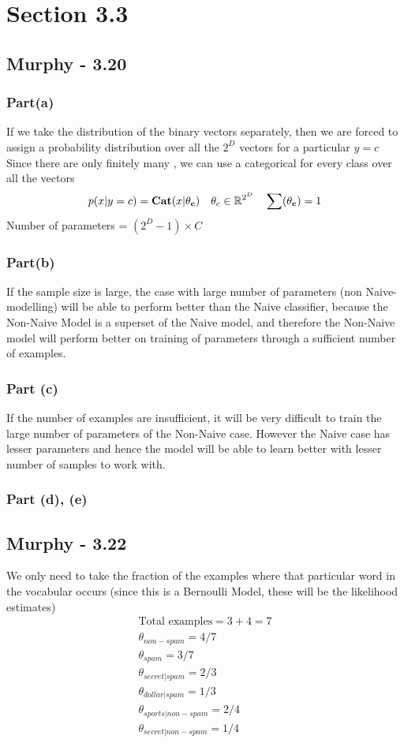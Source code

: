 \section{Section 3.3}

\subsection{Murphy - 3.20}
\subsubsection{Part(a)}
If we take the distribution of the binary vectors separately, then we are forced to assign a probability distribution over all the $2^D$ vectors for a particular $y = c$
Since there are only finitely many , we can use a categorical for every class over all the vectors
\begin{equation}
    p(x|y = c) =  \textbf{Cat}(x | \vb{\theta_c}) \ \ \ \theta_c \in \mathbb{R}^{2^D}  \ \ \ \sum(\vb{\theta_c}) = 1
\end{equation}
Number of parameters = $(2^D - 1) \times C$
\subsubsection{Part(b)}
If the sample size is large, the case with large number of parameters (non Naive- modelling) will be able to perform better than the Naive classifier, because the Non-Naive Model is a superset of the Naive model, and therefore the Non-Naive model will perform better on training of parameters through a sufficient number of examples.

\subsubsection{Part (c)}
If the number of examples are insufficient, it will be very difficult to train the large number of parameters of the Non-Naive case. However the Naive case has lesser parameters and hence the model will be able to learn better with lesser number of samples to work with.

\subsubsection{Part (d), (e)}


\subsection{Murphy - 3.22}
We only need to take the fraction of the examples where that particular word in the vocabular occurs  (since this is a Bernoulli Model, these will be the likelihood estimates)
\begin{gather}
    \text{Total examples} = 3 + 4 = 7\\
    \theta_{non-spam} = 4/7\\
    \theta_{spam} = 3/7\\
    \theta_{secret | spam} = 2/3\\
    \theta_{dollar| spam} = 1/3\\
    \theta_{sports | non-spam} = 2/4\\
    \theta_{secret| non-spam} = 1/4
\end{gather}
